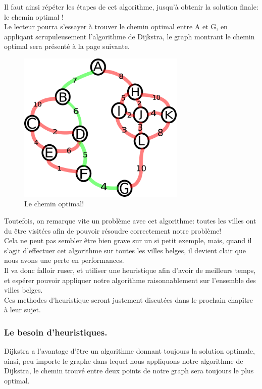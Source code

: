 \documentclass[a4paper, 12pt]{article}
\numberwithin{equation}{subsection}
\begin{document}
Il faut ainsi répéter les étapes de cet algorithme, jusqu'à obtenir la solution finale: le chemin optimal ! \\

Le lecteur pourra s'essayer à trouver le chemin optimal entre A et G, en appliqant scrupuleusement l'algorithme de Dijkstra, le graph montrant le chemin optimal sera présenté à la page suivante.
\begin{figure}[!hbt]
  \centering
  \includegraphics[width=8.0cm]{imgs/solved.png}
  \caption{Le chemin optimal!}
\end{figure}
Toutefois, on remarque vite un problème avec cet algorithme: toutes les villes ont du être visitées afin de pouvoir résoudre correctement notre problème! \\

Cela ne peut pas sembler être bien grave sur un si petit exemple, mais, quand il s'agit d'effectuer cet algorithme sur toutes les villes belges, il devient clair que nous avons une perte en performances.\\

Il va donc falloir ruser, et utiliser une heuristique afin d'avoir de meilleurs temps, et espérer pouvoir appliquer notre algorithme raisonnablement sur l'ensemble des villes belges. \\

Ces methodes d'heuristique seront justement discutées dans le prochain chapître à leur sujet. \\
\subsubsection{Le besoin d'heuristiques.}

Dijkstra a l'avantage d'être un algorithme donnant toujours la solution optimale, ainsi, peu importe le graphe dans lequel nous appliquons notre algorithme de Dijkstra, le chemin trouvé entre deux points de notre graph sera toujours le plus optimal. \\
\end{document}
